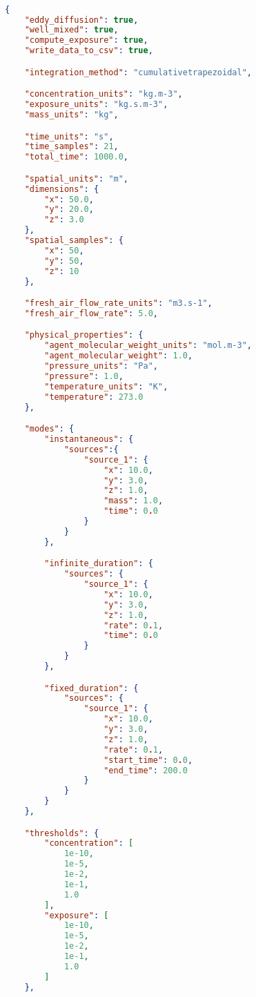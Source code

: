 \begin{lstlisting}[language=json,firstnumber=1]

{
    "eddy_diffusion": true,
    "well_mixed": true,
    "compute_exposure": true,
    "write_data_to_csv": true,

    "integration_method": "cumulativetrapezoidal",

    "concentration_units": "kg.m-3",
    "exposure_units": "kg.s.m-3",
    "mass_units": "kg",

    "time_units": "s",
    "time_samples": 21,
    "total_time": 1000.0,

    "spatial_units": "m",
    "dimensions": {
        "x": 50.0,
        "y": 20.0,
        "z": 3.0
    },
    "spatial_samples": {
        "x": 50,
        "y": 50,
        "z": 10 
    },

    "fresh_air_flow_rate_units": "m3.s-1",
    "fresh_air_flow_rate": 5.0,

    "physical_properties": {
        "agent_molecular_weight_units": "mol.m-3",
        "agent_molecular_weight": 1.0,
        "pressure_units": "Pa",
        "pressure": 1.0,
        "temperature_units": "K",
        "temperature": 273.0
    },

    "modes": {
        "instantaneous": {
            "sources":{
                "source_1": {
                    "x": 10.0,
                    "y": 3.0,
                    "z": 1.0,
                    "mass": 1.0,
                    "time": 0.0
                }
            }
        },

        "infinite_duration": {
            "sources": {
                "source_1": {
                    "x": 10.0,
                    "y": 3.0,
                    "z": 1.0,
                    "rate": 0.1,
                    "time": 0.0
                }
            }
        },

        "fixed_duration": {
            "sources": {
                "source_1": {
                    "x": 10.0,
                    "y": 3.0,
                    "z": 1.0,
                    "rate": 0.1,
                    "start_time": 0.0, 
                    "end_time": 200.0
                }
            }
        }
    },

    "thresholds": {
        "concentration": [
            1e-10,
            1e-5,
            1e-2,
            1e-1,
            1.0
        ],
        "exposure": [
            1e-10,
            1e-5,
            1e-2,
            1e-1,
            1.0
        ]
    },


\end{lstlisting}
